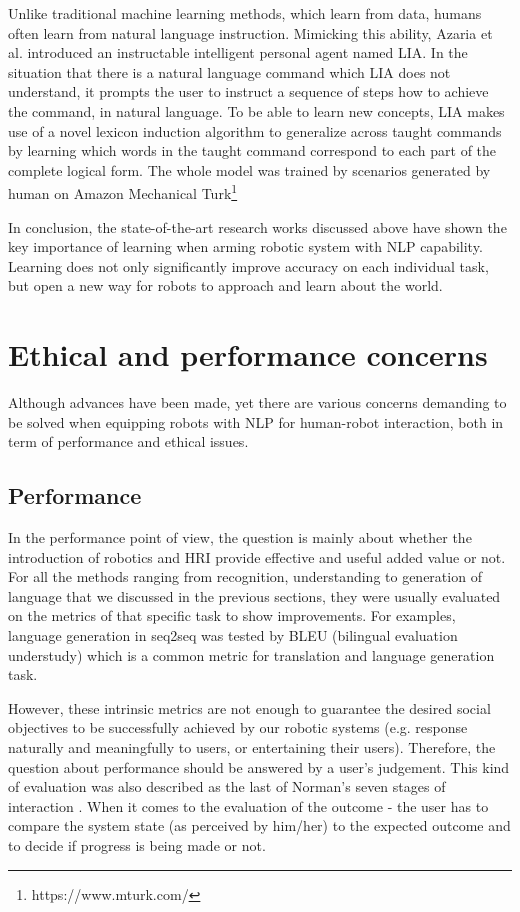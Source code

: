\documentclass[10pt, a4paper]{article}
\begin{document}
Unlike traditional machine learning methods, which learn from data, humans often learn from natural language instruction. Mimicking this ability, Azaria et al. \cite{azaria2016instructable} introduced an instructable intelligent personal agent named LIA. In the situation that there is a natural language command which LIA does not understand, it prompts the user to instruct a sequence of steps how to achieve the command, in natural language. To be able to learn new concepts, LIA makes use of a novel lexicon induction algorithm to generalize across taught commands by learning which words in the taught command correspond to each part of the complete logical form. The whole model was trained by scenarios generated by human on Amazon Mechanical Turk\footnote{https://www.mturk.com/}

In conclusion, the state-of-the-art research works discussed above have shown the key importance of learning when arming robotic system with NLP capability. Learning does not only significantly improve accuracy on each individual task, but open a new way for robots to approach and learn about the world.

\section{Ethical and performance concerns}
Although advances have been made, yet there are various concerns demanding to be solved when equipping robots with NLP for human-robot interaction, both in term of performance and ethical issues.

\subsection{Performance}
In the performance point of view, the question is mainly about whether the introduction of robotics and HRI provide effective and useful added value or not. For all the methods ranging from recognition, understanding to generation of language that we discussed in the previous sections, they were usually evaluated on the metrics of that specific task to show improvements. For examples, language generation in seq2seq\cite{sutskever2014sequence} was tested by BLEU (bilingual evaluation understudy) which is a common metric for translation and language generation task.

However, these intrinsic metrics are not enough to guarantee the desired social objectives to be successfully achieved by our robotic systems (e.g. response naturally and meaningfully to users, or entertaining their users). Therefore, the question about performance should be answered by a user's judgement. This kind of evaluation was also described as the last of Norman's seven stages of interaction \cite{norman1986cognitive}. When it comes to the evaluation of the outcome - the user has to compare the system state (as perceived by him/her) to the expected outcome and to decide if progress is being made or not.
\end{document}
